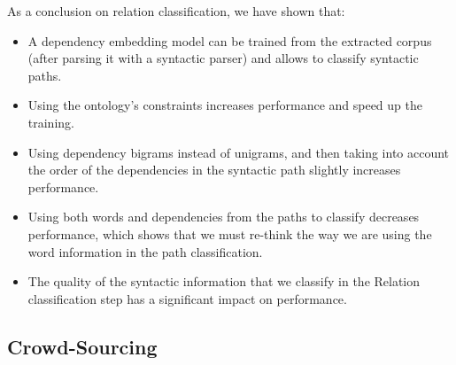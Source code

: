\documentclass[12pt]{article}
\begin{document}
As a conclusion on relation classification, we have shown that:
\begin{itemize}
\item A dependency embedding model can be trained from the extracted corpus (after parsing it with a syntactic parser) and allows to classify syntactic paths.
\item Using the ontology's constraints increases performance and speed up the training.
\item Using dependency bigrams instead of unigrams, and then taking into account the order of the dependencies in the syntactic path slightly increases performance.
\item Using both words and dependencies from the paths to classify decreases performance, which shows that we must re-think the way we are using the word information in the path classification.
\item The quality of the syntactic information that we classify in the Relation classification step has a significant impact on performance.
\end{itemize}

\subsection{Crowd-Sourcing}
\end{document}
